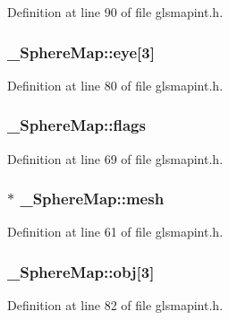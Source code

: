 Definition at line 90 of file glsmapint.\-h.

\hypertarget{struct___sphere_map_a59f21bb82cae80e5260d98bef2014783}{
\subsubsection[{eye}]{ \-\_\-\-Sphere\-Map\-::eye\mbox{[}3\mbox{]}}}\label{struct___sphere_map_a59f21bb82cae80e5260d98bef2014783}


Definition at line 80 of file glsmapint.\-h.

\hypertarget{struct___sphere_map_aaedcca05cc381f25caaa216035e61b32}{
\subsubsection[{flags}]{ \-\_\-\-Sphere\-Map\-::flags}}\label{struct___sphere_map_aaedcca05cc381f25caaa216035e61b32}


Definition at line 69 of file glsmapint.\-h.

\hypertarget{struct___sphere_map_aadeee07f5f55de1971f98fe89c3c82c7}{
\subsubsection[{mesh}]{$\ast$ \-\_\-\-Sphere\-Map\-::mesh}}\label{struct___sphere_map_aadeee07f5f55de1971f98fe89c3c82c7}


Definition at line 61 of file glsmapint.\-h.

\hypertarget{struct___sphere_map_a7a237a3fc3c5315c6db303c4f01ce43b}{
\subsubsection[{obj}]{ \-\_\-\-Sphere\-Map\-::obj\mbox{[}3\mbox{]}}}\label{struct___sphere_map_a7a237a3fc3c5315c6db303c4f01ce43b}


Definition at line 82 of file glsmapint.\-h.

